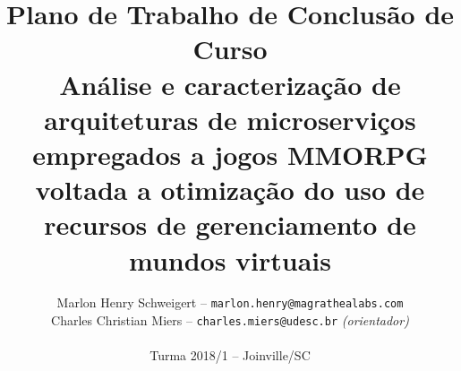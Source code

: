 \documentclass[11pt]{article}
\begin{document}
\pagestyle{fancy}

\title{
Plano de Trabalho de Conclusão de Curso\\
Análise e caracterização de arquiteturas de microserviços empregados a jogos MMORPG voltada a otimização do uso de recursos de gerenciamento de mundos virtuais
}

\author{
Marlon Henry Schweigert -- \texttt{marlon.henry@magrathealabs.com}\\
Charles Christian Miers -- \texttt{charles.miers@udesc.br} {\it (orientador)}\\
~\\
Turma 2018/1 -- Joinville/SC
}
\end{document}
